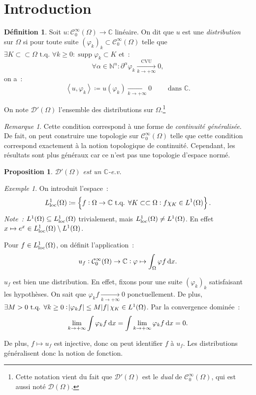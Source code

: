 \documentclass{report}
\DeclareMathOperator{\supp}{supp}
\newcommand{\C}{{\mathbb C}}
\newcommand{\N}{{\mathbb N}}
\newcommand{\scpr}[2]{\left\langle#1, #2\right\rangle}
\newcommand{\tq}{\text{ t.q. }}
\newcommand{\st}{\tq}
\newcommand{\pinfty}{{+\infty}}
\newcommand{\loc}{{\text{\textnormal{loc}}}}
\newtheorem{prp}[thm]{Proposition}
\theoremstyle{definition}
\newtheorem{déf}[thm]{Définition}
\theoremstyle{remark}
\newtheorem*{rmq}{Remarque}
\newtheorem{ex}{Exemple}[chapter]
\begin{document}
\section{Introduction}
\begin{déf} Soit $u : \mathcal C^\infty_0(\Omega) \to \C$ linéaire. On dit que $u$ est une \textit{distribution} sur $\Omega$ si pour toute suite $(\varphi_k)_k \subset \mathcal C^\infty_0(\Omega)$
telle que $\exists K \subset\subset \Omega \st \forall k \geq 0 : \supp \varphi_k \subset K$ et~:
\[\forall \alpha \in \N^n : \partial^\alpha\varphi_k \xrightarrow[k \to \pinfty]{\text{CVU}} 0,\]
on a~:
\[\scpr u{\varphi_k} \coloneqq u(\varphi_k) \xrightarrow[k \to \pinfty]{} 0 \qquad\text{ dans } \C.\]

On note $\mathcal D'(\Omega)$ l'ensemble des distributions sur $\Omega$.\footnote{Cette notation vient du fait que $\mathcal D'(\Omega)$ est le \textit{dual} de $\mathcal C^\infty_0(\Omega)$,
qui est aussi noté $\mathcal D(\Omega)$.}
\end{déf}

\begin{rmq} Cette condition correspond à une forme de \textit{continuité généralisée}. De fait, on peut construire une topologie sur $\mathcal C^\infty_0(\Omega)$ telle que cette
condition correspond exactement à la notion topologique de continuité. Cependant, les résultats sont plus généraux car ce n'est pas une topologie d'espace normé.
\end{rmq}

\begin{prp} $\mathcal D'(\Omega)$ est un $\C$-e.v.
\end{prp}

\begin{ex}\label{ex:L^1_loc}
On introduit l'espace~:
\[L^1_\loc(\Omega) \coloneqq \left\{f : \Omega \to \C \st \forall K \subset\subset \Omega : f\chi_K \in L^1(\Omega)\right\}.\]
\textit{Note~:} $L^1(\Omega) \subseteq L^1_\loc(\Omega)$ trivialement, mais $L^1_\loc(\Omega) \neq L^1(\Omega)$. En effet $x \mapsto e^x \in L^1_\loc(\Omega) \setminus L^1(\Omega)$.

Pour $f \in L^1_\loc(\Omega)$, on définit l'application~:
\[u_f : \mathcal C^\infty_0(\Omega) \to \C : \varphi \mapsto \int_\Omega\varphi f\dif x.\]

$u_f$ est bien une distribution. En effet, fixons pour une suite $(\varphi_k)_k$ satisfaisant les hypothèses. On sait que $\varphi_kf \xrightarrow[k \to \pinfty]{} 0$
ponctuellement. De plus, $\exists M > 0 \st \forall k \geq 0 : \abs {\varphi_kf} \leq M\abs f\chi_K \in L^1(\Omega)$. Par la convergence dominée~:
\[\lim_{k \to \pinfty}\int\varphi_k f\dif x = \int \lim_{k \to \pinfty}\varphi_k f\dif x = 0.\]

De plus, $f \mapsto u_f$ est injective, donc on peut identifier $f$ à $u_f$. Les distributions généralisent donc la notion de fonction.
\end{ex}
\end{document}
